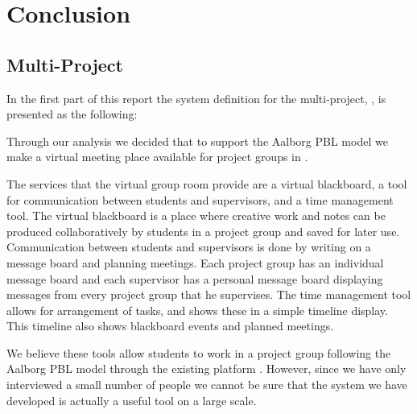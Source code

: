 \chapter{Conclusion}
\label{chap:conclusion}
\section{Multi-Project}
\label{sec:multiconclusion}
In the first part of this report the system definition for the multi-project, \system{}, is presented as the following: 



Through our analysis we decided that to support the Aalborg PBL model we make a virtual meeting place available for project groups in \moodle{}.

The services that the virtual group room provide are a virtual blackboard, a tool for communication between students and supervisors, and a time management tool.
The virtual blackboard is a place where creative work and notes can be produced collaboratively by students in a project group and saved for later use.
Communication between students and supervisors is done by writing on a message board and planning meetings.
Each project group has an individual message board and each supervisor has a personal message board displaying messages from every project group that he supervises.
The time management tool allows for arrangement of tasks, and shows these in a simple timeline display.
This timeline also shows blackboard events and planned meetings.


We believe these tools allow students to work in a project group following the Aalborg PBL model through the existing platform \moodle{}.
However, since we have only interviewed a small number of people we cannot be sure that the system we have developed is actually a useful tool on a large scale. %


